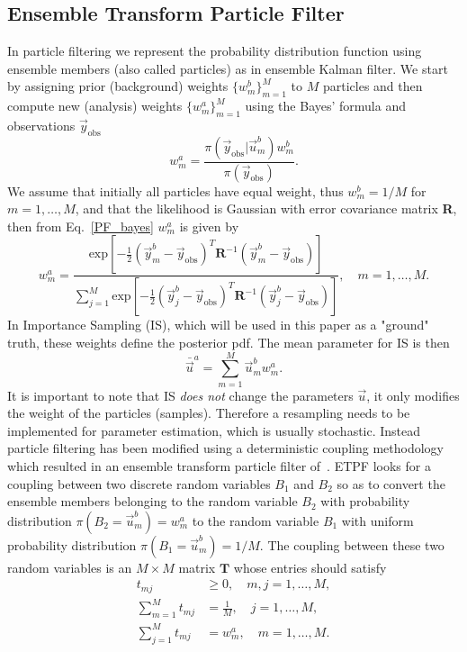 \documentclass[12, a4paper]{article}
\numberwithin{equation}{section}
\begin{document}
\subsection{Ensemble Transform Particle Filter}\label{PF} 
In particle filtering  we represent the probability distribution function using ensemble members (also called particles) as in ensemble Kalman filter. We start by assigning prior (background) weights $\{w_m^b\}_{m=1}^M$ to $M$ particles and then compute new (analysis) weights  $\{w_m^a\}_{m=1}^M$ using the Bayes' formula and observations $\vec{y}_{\text{obs}}$
\begin{equation} \label{PF_bayes}
w_m^{a} = \frac {\pi (\vec{y}_{\text{obs}}| \vec{u}_m^b)w_m^{b} } {\pi (\vec{y}_{\text{obs}})}.
\end{equation}
We assume that initially all particles have equal weight, thus $w_m^b=1/M$ for $m=1,\hdots,M$, and that the likelihood is Gaussian with error covariance matrix \textbf{R}, then from Eq.~\eqref{PF_bayes} $w_m^a$ is given by
\begin{equation} \label{PF_wgt}
w^a_m = \frac{\text{exp}\left[-\frac{1}{2}(\vec{y}_m^b - \vec{y}_{\text{obs}})^T \textbf{R}^{-1} (\vec{y}_m^b - \vec{y}_{\text{obs}})\right]}{\sum_{j=1}^{M}\text{exp}\left[-\frac{1}{2}(\vec{y}_j^b - \vec{y}_{\text{obs}})^T \textbf{R}^{-1} (\vec{y}_j^b - \vec{y}_{\text{obs}})\right]},  \quad m = 1,\hdots,M.
\end{equation}
In Importance Sampling (IS), which will be used in this paper as a "ground" truth, these weights define the posterior pdf. The mean parameter for IS is then
\[
\bar{\vec{u}}^a = \sum_{m=1}^M\vec{u}_m^b w^a_m.
\]
It is important to note that IS \textit{does not} change the parameters $\vec{u}$, it only modifies the weight of the particles (samples). Therefore a resampling needs to be implemented for parameter estimation, which is usually stochastic. Instead particle filtering has been modified using a deterministic coupling methodology which resulted in an ensemble transform particle filter of~\cite{ReCo15}. ETPF looks for a coupling between two discrete random variables $B_1$ and $B_2$  so as to convert the ensemble members belonging to the random variable $B_2$ with probability distribution $\pi (B_2 = \vec{u}_m^b) =w^a_m  $ to the random variable $B_1$ with uniform probability distribution $\pi (B_1 = \vec{u}_m^b) = 1/M$. The coupling between these two random variables is an $M \times M$ matrix $\textbf{T}$ whose entries should satisfy 
\begin{align}  \label{Tconditions3}
t_{mj} & \geq 0,  \quad m,j = 1,\hdots,M, \\ \label{Tconditions1}
\sum_{m=1}^{M} t_{mj} & = \frac{1}{M},   \quad j = 1,\hdots,M,\\ \label{Tconditions2}
\sum_{j=1}^{M} t_{mj} & =w^a_m, \quad m = 1,\hdots,M.
\end{align} 
\end{document}
